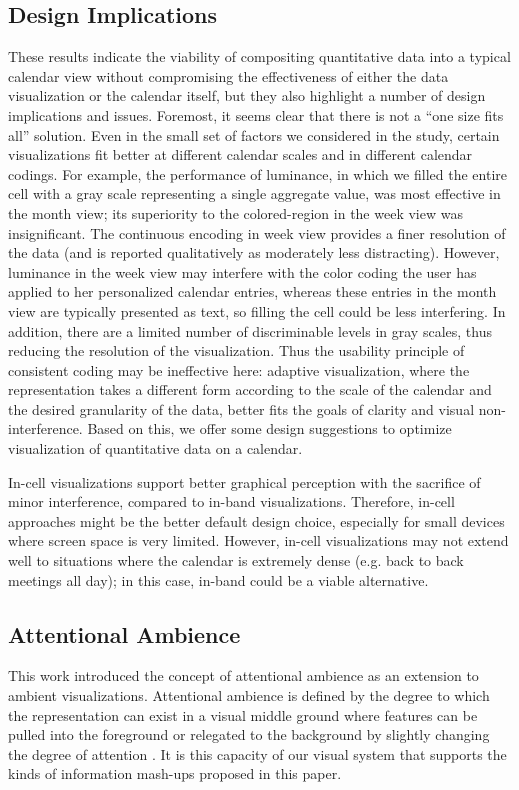 \documentclass[12pt,oneside]{book}
\begin{document}
\subsection{Design Implications}
These results indicate the viability of compositing quantitative data into a typical calendar view without compromising the effectiveness of either the data visualization or the calendar itself, but they also highlight a number of design implications and issues. Foremost, it seems clear that there is not a ``one size fits all'' solution. Even in the small set of factors we considered in the study, certain visualizations fit better at different calendar scales and in different calendar codings. For example, the performance of luminance, in which we filled the entire cell with a gray scale representing a single aggregate value, was most effective in the month view; its superiority to the colored-region in the week view was insignificant. The continuous encoding in week view provides a finer resolution of the data (and is reported qualitatively as moderately less distracting). However, luminance in the week view may interfere with the color coding the user has applied to her personalized calendar entries, whereas these entries in the month view are typically presented as text, so filling the cell could be less interfering. In addition, there are a limited number of discriminable levels in gray scales, thus reducing the resolution of the visualization. Thus the usability principle of consistent coding may be ineffective here: adaptive visualization, where the representation takes a different form according to the scale of the calendar and the desired granularity of the data, better fits the goals of clarity and visual non-interference. Based on this, we offer some design suggestions to optimize visualization of quantitative data on a calendar.

In-cell visualizations support better graphical perception with the sacrifice of minor interference, compared to in-band visualizations. Therefore, in-cell approaches might be the better default design choice, especially for small devices where screen space is very limited. However, in-cell visualizations may not extend well to situations where the calendar is extremely dense (e.g. back to back meetings all day); in this case, in-band could be a viable alternative.

\subsection{Attentional Ambience}
This work introduced the concept of attentional ambience as an extension to ambient visualizations. Attentional ambience is defined by the degree to which the representation can exist in a visual middle ground where features can be pulled into the foreground or relegated to the background by slightly changing the degree of attention \cite{bartram_effect_2011}. It is this capacity of our visual system that supports the kinds of information mash-ups proposed in this paper.
\end{document}

